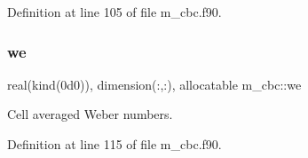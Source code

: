Definition at line 105 of file m\+\_\+cbc.\+f90.

\mbox{\label{namespacem__cbc_a532334846efcbbca82ab11f26e28c5f7}} 
\subsubsection{\texorpdfstring{we}{we}}
{\footnotesize\ttfamily real(kind(0d0)), dimension(\+:,\+:), allocatable m\+\_\+cbc\+::we}



Cell averaged Weber numbers. 



Definition at line 115 of file m\+\_\+cbc.\+f90.

